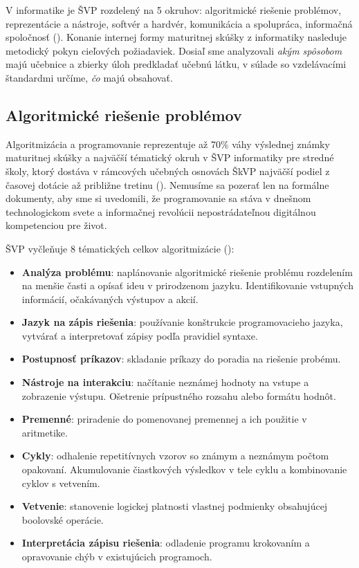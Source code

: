 V informatike je ŠVP rozdelený na 5 okruhov: algoritmické riešenie problémov, reprezentácie a nástroje, softvér a hardvér, komunikácia a spolupráca, informačná spoločnosť (\cite{statny_2023}). Konanie internej formy maturitnej skúšky z informatiky nasleduje metodický pokyn cieľových požiadaviek. Dosiaľ sme analyzovali \emph{akým spôsobom} majú učebnice a zbierky úloh predkladať učebnú látku, v súlade so vzdelávacími štandardmi určíme, \emph{čo} majú obsahovať.

\subsection{Algoritmické riešenie problémov}
Algoritmizácia a programovanie reprezentuje až 70\% váhy výslednej známky maturitnej skúšky a najväčší tématický okruh v ŠVP informatiky pre stredné školy, ktorý dostáva v rámcových učebných osnovách ŠkVP najväčší podiel z časovej dotácie až približne tretinu (\cite{cp_2023}). Nemusíme sa pozerať len na formálne dokumenty, aby sme si uvedomili, že programovanie sa stáva v dnešnom technologickom svete a informačnej revolúcii nepostrádateľnou digitálnou kompetenciou pre život.

ŠVP vyčleňuje 8 tématických celkov algoritmizácie (\cite{statny_2023}):
\begin{itemize}[noitemsep,topsep=0pt]
\item \textbf{Analýza problému}: naplánovanie algoritmické riešenie problému rozdelením na menšie časti a opísať ideu v prirodzenom jazyku. Identifikovanie vstupných informácií, očakávaných výstupov a akcií. 
\item \textbf{Jazyk na zápis riešenia}: používanie konštrukcie programovacieho jazyka, vytvárať a interpretovať zápisy podľa pravidiel syntaxe.
\item \textbf{Postupnosť príkazov}: skladanie príkazy do poradia na riešenie probému.
\item \textbf{Nástroje na interakciu}: načítanie neznámej hodnoty na vstupe a zobrazenie výstupu. Ošetrenie prípustného rozsahu alebo formátu hodnôt.
\item \textbf{Premenné}: priradenie do pomenovanej premennej a ich použitie v aritmetike.
\item \textbf{Cykly}: odhalenie repetitívnych vzorov so známym a neznámym počtom opakovaní. Akumulovanie čiastkových výsledkov v tele cyklu a kombinovanie cyklov s vetvením.
\item \textbf{Vetvenie}: stanovenie logickej platnosti vlastnej podmienky obsahujúcej boolovské operácie.
\item \textbf{Interpretácia zápisu riešenia}: odladenie programu krokovaním a opravovanie chýb v existujúcich programoch.
\end{itemize}

